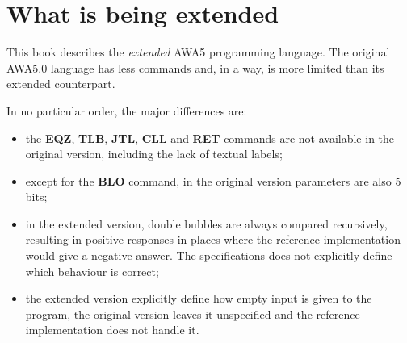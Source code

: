\documentclass[11pt,a4paper,draft]{book}
\begin{document}
\chapter{What is being extended}
This book describes the \emph{extended} AWA5 programming language. The
original AWA5.0 language has less commands and, in a way, is more
limited than its extended counterpart.

In no particular order, the major differences are:
\begin{itemize}
\item the \textbf{EQZ}, \textbf{TLB}, \textbf{JTL}, \textbf{CLL} and
  \textbf{RET} commands are not available in the original version,
  including the lack of textual labels;
\item except for the \textbf{BLO} command, in the original version
  parameters are also \num{5} bits;
\item in the extended version, double bubbles are always compared
  recursively, resulting in positive responses in places where the
  reference implementation would give a negative answer. The
  specifications does not explicitly define which behaviour is
  correct;
\item the extended version explicitly define how empty input is given
  to the program, the original version leaves it unspecified and the
  reference implementation does not handle it.
\end{itemize}
\end{document}

